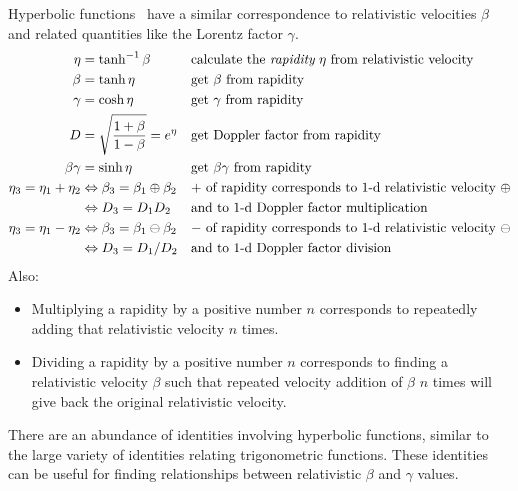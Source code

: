 \documentclass[a4paper]{article}
\theoremstyle{plain}
\theoremstyle{definition}
\begin{document}
Hyperbolic functions~\cite{WikipediaHyperbolicFunctions} have a
similar correspondence to relativistic velocities $\beta$ and related
quantities like the Lorentz factor $\gamma$.
\begin{align}
\eta & = \tanh^{-1} \beta & & \text{calculate the {\em rapidity} $\eta$ from relativistic velocity} \\
\beta & = \tanh \eta & & \text{get $\beta$ from rapidity} \label{eqn:betaHyperbolic} \\
\gamma & = \cosh \eta & & \text{get $\gamma$ from rapidity} \label{eqn:gammaHyperbolic} \\
D & = \sqrt{\frac{1+\beta}{1-\beta}} = e^\eta & & \text{get Doppler factor from rapidity} \label{eqn:dopplerFactorHyperbolic} \\
\beta \gamma & = \sinh \eta & & \text{get $\beta \gamma$ from rapidity} \label{eqn:betaGammaHyperbolic} \\
\eta_3 = \eta_1 + \eta_2 & \Leftrightarrow \beta_3 = \beta_1 \oplus \beta_2 & & \text{$+$ of rapidity corresponds to 1-d relativistic velocity $\oplus$} \\
    & \Leftrightarrow D_3 = D_1 D_2 & & \text{and to 1-d Doppler factor multiplication} \\
\eta_3 = \eta_1 - \eta_2 & \Leftrightarrow \beta_3 = \beta_1 \ominus \beta_2 & & \text{$-$ of rapidity corresponds to 1-d relativistic velocity $\ominus$} \\
    & \Leftrightarrow D_3 = D_1 / D_2 & & \text{and to 1-d Doppler factor division} \\
\end{align}
Also:
\begin{itemize}
\item Multiplying a rapidity by a positive number $n$ corresponds to
  repeatedly adding that relativistic velocity $n$ times.
\item Dividing a rapidity by a positive number $n$ corresponds to
  finding a relativistic velocity $\beta$ such that repeated velocity
  addition of $\beta$ $n$ times will give back the original
  relativistic velocity.
\end{itemize}
There are an abundance of identities involving hyperbolic functions,
similar to the large variety of identities relating trigonometric
functions.  These identities can be useful for finding relationships
between relativistic $\beta$ and $\gamma$ values.
\end{document}
